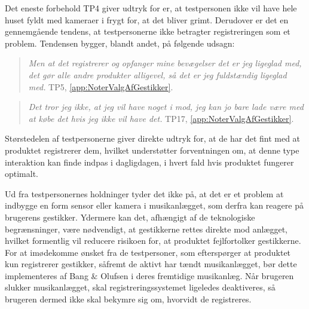 Det eneste forbehold TP4 giver udtryk for er, at testpersonen ikke vil have hele huset fyldt med kameraer i frygt for, at det bliver grimt. Derudover er det en gennemgående tendens, at testpersonerne ikke betragter registreringen som et problem. Tendensen bygger, blandt andet, på følgende udsagn: 
%
\begin{quotation}
\noindent
\textit{Men at det registrerer og opfanger mine bevægelser det er jeg ligeglad med, det gør alle andre produkter alligevel, så det er jeg fuldstændig ligeglad med.} TP5, \autoref{app:NoterValgAfGestikker}. 
\end{quotation}
%
%
\begin{quotation}
\noindent
\textit{Det tror jeg ikke, at jeg vil have noget i mod, jeg kan jo bare lade være med at købe det hvis jeg ikke vil have det.} TP17, \autoref{app:NoterValgAfGestikker}. 
\end{quotation}
%
Størstedelen af testpersonerne giver direkte udtryk for, at de har det fint med at produktet registrerer dem, hvilket understøtter forventningen om, at denne type interaktion kan finde indpas i dagligdagen, i hvert fald hvis produktet fungerer optimalt.  

Ud fra testpersonernes holdninger tyder det ikke på, at det er et problem at indbygge en form sensor eller kamera i musikanlægget, som derfra kan reagere på brugerens gestikker. Ydermere kan det, afhængigt af de teknologiske begrænsninger, være nødvendigt, at gestikkerne rettes direkte mod anlægget, hvilket formentlig vil reducere risikoen for, at produktet fejlfortolker gestikkerne. For at imødekomme ønsket fra de testpersoner, som efterspørger at produktet kun registrerer gestikker, såfremt de aktivt har tændt musikanlægget, bør dette implementeres af Bang $\&$ Olufsen i deres fremtidige musikanlæg. Når brugeren slukker musikanlægget, skal registreringssystemet ligeledes deaktiveres, så brugeren dermed ikke skal bekymre sig om, hvorvidt de registreres.  

